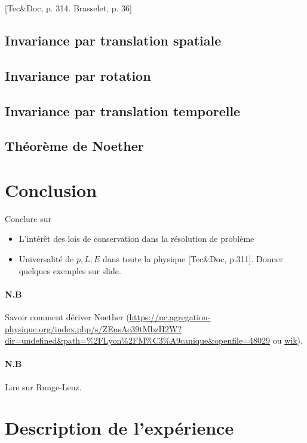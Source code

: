 \documentclass[11pt]{report}
\numberwithin{figure}{section}
\numberwithin{equation}{section}
\numberwithin{table}{section}
\newcommand{\1}{\boldsymbol{1}}
\begin{document}
[Tec\&Doc, p. 314. Brasselet, p. 36]

\subsection{Invariance par translation spatiale}

\subsection{Invariance par rotation}

\subsection{Invariance par translation temporelle}

\subsection{Théorème de Noether}




\section*{Conclusion}

Conclure sur 
\begin{itemize}
\item L'intérêt des lois de conservation dans la résolution de problème
\item Universalité de $p, L, E$ dans toute la physique [Tec\&Doc, p.311]. Donner quelques exemples sur slide.
\end{itemize}

\paragraph{N.B} Savoir comment dériver Noether (\url{https://nc.agregation-physique.org/index.php/s/ZEnsAc39tMbzH2W?dir=undefined&path=%2FLyon%2FM%C3%A9canique&openfile=48029} ou \href{https://fr.wikipedia.org/wiki/Th%C3%A9or%C3%A8me_de_Noether_(physique)#D%C3%A9monstrations}{wik}). \\
\paragraph{N.B} Lire sur Runge-Lenz.

\section*{Description de l'expérience}
\end{document}
